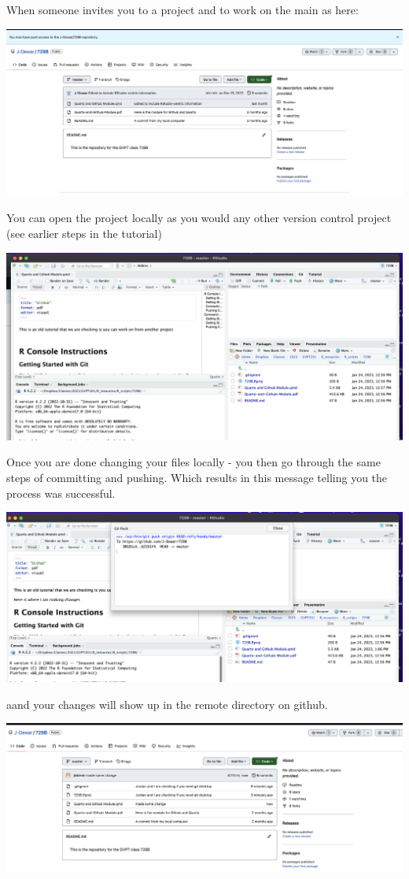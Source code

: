 \documentclass[
  letterpaper,
  DIV=11,
  numbers=noendperiod]{scrartcl}
\begin{document}
When someone invites you to a project and to work on the main as here:

\includegraphics{figures/30.png}

You can open the project locally as you would any other version control
project (see earlier steps in the tutorial)

\includegraphics{figures/31.png}

Once you are done changing your files locally - you then go through the
same steps of committing and pushing. Which results in this message
telling you the process was successful.

\includegraphics{figures/32.png}

aand your changes will show up in the remote directory on github.

\includegraphics{figures/33.png}
\end{document}
